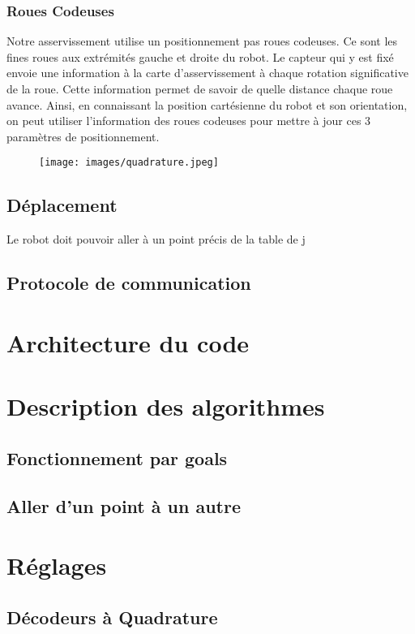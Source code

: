 \documentclass{article}
\begin{document}
				\subsubsection{Roues Codeuses}
				Notre asservissement utilise un positionnement pas roues codeuses. Ce sont les fines roues aux extrémités gauche et droite du robot. Le capteur qui y est fixé envoie une information à la carte d'asservissement à chaque rotation significative de la roue. Cette information permet de savoir de quelle distance chaque roue avance. Ainsi, en connaissant la position cartésienne du robot et son orientation, on peut utiliser l'information des roues codeuses pour mettre à jour ces 3 paramètres de positionnement.

				\begin{figure}[h]
					\centering
					\texttt{[image: images/quadrature.jpeg]}
				\end{figure}
			\subsection{Déplacement}
			Le robot doit pouvoir aller à un point précis de la table de j
			\subsection{Protocole de communication}

		\section{Architecture du code}

		\section{Description des algorithmes}
			\subsection{Fonctionnement par goals}
			\subsection{Aller d'un point à un autre}

		\section{Réglages}
			
			\subsection{Décodeurs à Quadrature}
\end{document}
